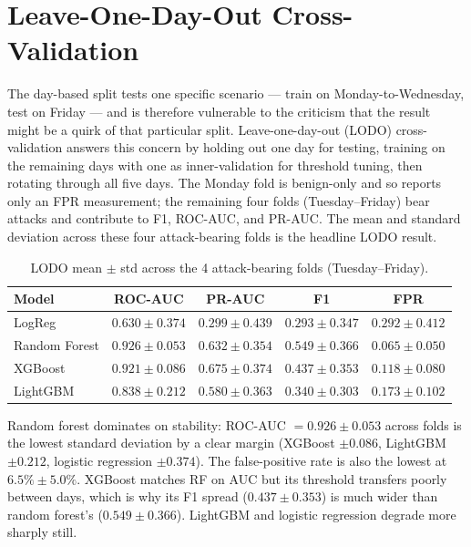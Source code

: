 \chapter{Leave-One-Day-Out Cross-Validation}
\label{ch:lodo}

The day-based split tests one specific scenario --- train on
Monday-to-Wednesday, test on Friday --- and is therefore vulnerable to the
criticism that the result might be a quirk of that particular split.
Leave-one-day-out (LODO) cross-validation answers this concern by
holding out one day for testing, training on the remaining days with
one as inner-validation for threshold tuning, then rotating through
all five days. The Monday fold is benign-only and so reports only an FPR
measurement; the remaining four folds (Tuesday--Friday) bear attacks and
contribute to F1, ROC-AUC, and PR-AUC. The mean and standard deviation
across these four attack-bearing folds is the headline LODO result.

\begin{table}[H]
    \centering
    \caption{LODO mean $\pm$ std across the 4 attack-bearing folds (Tuesday--Friday).}
    \label{tab:lodo}
    \small
    \begin{tabular}{lcccc}
        \toprule
        \textbf{Model} & \textbf{ROC-AUC} & \textbf{PR-AUC} & \textbf{F1} & \textbf{FPR} \\
        \midrule
        LogReg & $0.630 \pm 0.374$ & $0.299 \pm 0.439$ & $0.293 \pm 0.347$ & $0.292 \pm 0.412$ \\
        Random Forest & $\mathbf{0.926 \pm 0.053}$ & $0.632 \pm 0.354$ & $\mathbf{0.549 \pm 0.366}$ & $\mathbf{0.065 \pm 0.050}$ \\
        XGBoost & $0.921 \pm 0.086$ & $0.675 \pm 0.374$ & $0.437 \pm 0.353$ & $0.118 \pm 0.080$ \\
        LightGBM & $0.838 \pm 0.212$ & $0.580 \pm 0.363$ & $0.340 \pm 0.303$ & $0.173 \pm 0.102$ \\
        \bottomrule
    \end{tabular}
\end{table}

Random forest dominates on stability: ROC-AUC $= 0.926 \pm 0.053$ across
folds is the lowest standard deviation by a clear margin (XGBoost
$\pm 0.086$, LightGBM $\pm 0.212$, logistic regression $\pm 0.374$). The
false-positive rate is also the lowest at $6.5\% \pm 5.0\%$. XGBoost
matches RF on AUC but its threshold transfers poorly between days, which
is why its F1 spread ($0.437 \pm 0.353$) is much wider than random
forest's ($0.549 \pm 0.366$). LightGBM and logistic regression degrade
more sharply still.

